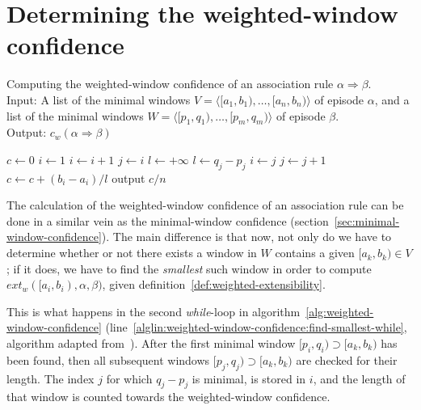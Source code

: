 \section{Determining the weighted-window confidence}
\label{sec:weighted-window-confidence}

\begin{algorithm}

\caption{Computing the weighted-window confidence of an association rule $ \alpha \Rightarrow \beta $.\\
Input: A list of the minimal windows $ V = \langle [a_1, b_1), \ldots, [a_n, b_n) \rangle $ of episode $ \alpha $, and a list of the minimal windows $ W = \langle [p_1, q_1), \ldots, [p_m, q_m) \rangle $ of episode $ \beta $.\\
Output: $ c_w(\alpha \Rightarrow \beta) $
}

\begin{algorithmic}[1]

\State $ c \gets 0 $
\State $ i \gets 1 $
        \State $ i \gets i + 1 $
    \EndWhile
    \State $ j \gets i $
    \State $ l \gets +\infty $
     \label{alglin:weighted-window-confidence:find-smallest-while}
            \State $ l \gets q_j - p_j $
            \State $ i \gets j $
        \EndIf
        \State $ j \gets j + 1 $
    \EndWhile
        \State $ c \gets c + (b_i - a_i) / l $
    \EndIf
\EndFor
\State output $ c / n $

\end{algorithmic}

\label{alg:weighted-window-confidence}
\end{algorithm}

The calculation of the weighted-window confidence of an association rule can be done in a similar vein as the minimal-window confidence (section~\ref{sec:minimal-window-confidence}). The main difference is that now, not only do we have to determine whether or not there exists a window in $ W $ contains a given $ [a_k, b_k) \in V $; if it does, we have to find the \emph{smallest} such window in order to compute $ ext_w([a_i, b_i), \alpha, \beta) $, given definition~\ref{def:weighted-extensibility}.

This is what happens in the second \emph{while}-loop in algorithm~\ref{alg:weighted-window-confidence} (line~\ref{alglin:weighted-window-confidence:find-smallest-while}, algorithm adapted from~\cite{cule2014marbles}). After the first minimal window $ [p_i, q_i) \supset [a_k, b_k) $ has been found, then all subsequent windows $ [p_j, q_j) \supset [a_k, b_k) $ are checked for their length. The index $ j $ for which $ q_j - p_j $ is minimal, is stored in $ i $, and the length of that window is counted towards the weighted-window confidence.

